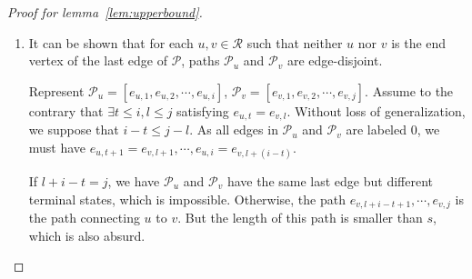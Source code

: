 \begin{proof}[Proof for lemma~\ref{lem:upperbound}]
\begin{enumerate}
        \item It can be shown that for each $u,v\in\mathscr{R}$ such that neither $u$ nor $v$ is the end vertex of the last edge of $\mathscr{P}$, paths $\mathcal{P}_{u}$ and $\mathcal{P}_{v}$ are edge-disjoint.
    
            Represent $\mathcal{P}_{u} = [e_{u,1},e_{u,2},\cdots,e_{u,i}]$, $\mathcal{P}_{v}=[e_{v,1},e_{v,2},\cdots,e_{v,j}]$. Assume to the contrary that $\exists t\leq i,l\leq j$ satisfying $e_{u,t}=e_{v,l}$. Without loss of generalization, we suppose that $i-t\leq j-l$. As all edges in $\mathcal{P}_{u}$ and $\mathcal{P}_{v}$ are labeled $0$, we must have $e_{u,t+1}=e_{v,l+1},\cdots,e_{u,i}=e_{v,l+(i-t)}$. 
            
            If $l+i-t=j$, we have $\mathcal{P}_{u}$ and $\mathcal{P}_{v}$ have the same last edge but different terminal states, which is impossible. Otherwise, the path $e_{v,l+i-t+1},\cdots,e_{v,j}$ is the path connecting $u$ to $v$. But the length of this path is smaller than $s$, which is also absurd.
    \end{enumerate}
    
    
    
    
    
    

\end{proof}
